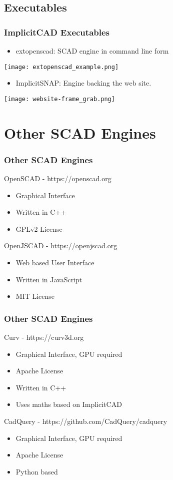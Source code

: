 \documentclass{beamer}
\begin{document}
\subsection{Executables}
\begin{frame}
\frametitle{ImplicitCAD Executables}
\begin{itemize}
\item extopenscad: SCAD engine in command line form
\end{itemize}
\texttt{[image: extopenscad\_example.png]}
\begin{itemize}
\item ImplicitSNAP: Engine backing the web site.
\end{itemize}
\texttt{[image: website-frame\_grab.png]}
\end{frame}

\section{Other SCAD Engines}
\begin{frame}
\frametitle{Other SCAD Engines}
\begin{block}{OpenSCAD - https://openscad.org}
\begin{itemize}
\item Graphical Interface
\item Written in C++
\item GPLv2 License
\end{itemize}
\end{block}
\begin{block}{OpenJSCAD - https://openjscad.org}
\begin{itemize}
\item Web based User Interface
\item Written in JavaScript
\item MIT License
\end{itemize}
\end{block}
\end{frame}

\begin{frame}
\frametitle{Other SCAD Engines}
\begin{block}{Curv - https://curv3d.org}
\begin{itemize}
\item Graphical Interface, GPU required
\item Apache License
\item Written in C++
\item Uses maths based on ImplicitCAD
\end{itemize}
\end{block}
\begin{block}{CadQuery - https://github.com/CadQuery/cadquery}
\begin{itemize}
\item Graphical Interface, GPU required
\item Apache License
\item Python based
\end{itemize}
\end{block}
\end{frame}
\end{document}
